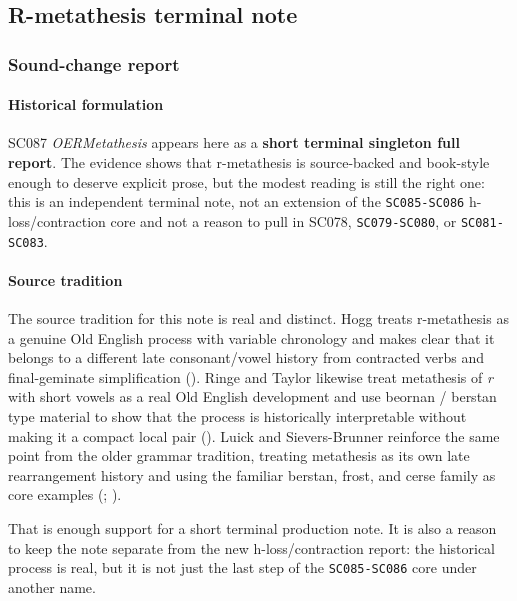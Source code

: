 \documentclass[
  british,
  a4paper,
]{article}
\begin{document}
\subsection{R-metathesis terminal
note}\label{r-metathesis-terminal-note}

\subsubsection{Sound-change report}\label{sound-change-report-52}

\paragraph{Historical formulation}\label{historical-formulation-52}

SC087 \emph{OERMetathesis} appears here as a \textbf{short terminal
singleton full report}. The evidence shows that r-metathesis is
source-backed and book-style enough to deserve explicit prose, but the
modest reading is still the right one: this is an independent terminal
note, not an extension of the \texttt{SC085-SC086} h-loss/contraction
core and not a reason to pull in SC078, \texttt{SC079-SC080}, or
\texttt{SC081-SC083}.

\paragraph{Source tradition}\label{source-tradition-52}

The source tradition for this note is real and distinct. Hogg treats
r-metathesis as a genuine Old English process with variable chronology
and makes clear that it belongs to a different late consonant/vowel
history from contracted verbs and final-geminate simplification
(). Ringe and Taylor likewise treat
metathesis of \emph{r} with short vowels as a real Old English
development and use beornan / berstan type material to show that the
process is historically interpretable without making it a compact local
pair (). Luick and
Sievers-Brunner reinforce the same point from the older grammar
tradition, treating metathesis as its own late rearrangement history and
using the familiar berstan, frost, and cerse family as core examples
(;
).

That is enough support for a short terminal production note. It is also
a reason to keep the note separate from the new h-loss/contraction
report: the historical process is real, but it is not just the last step
of the \texttt{SC085-SC086} core under another name.
\end{document}
